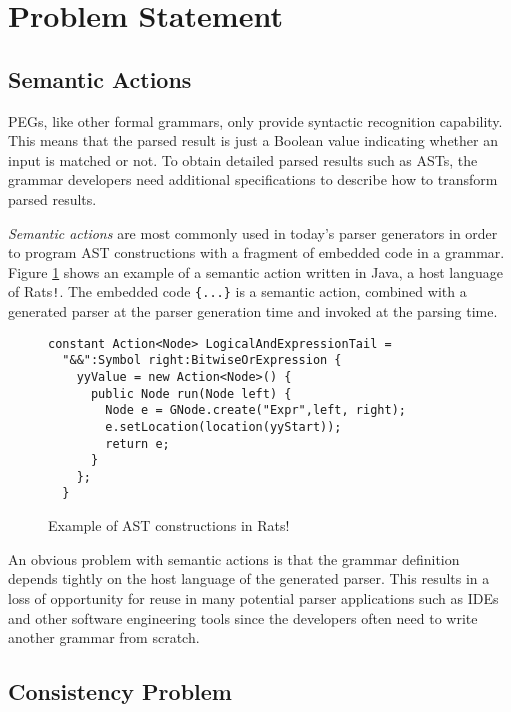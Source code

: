 \documentclass[JIP]{ipsj}
\begin{document}
\section{Problem Statement} 



\subsection{Semantic Actions}

PEGs, like other formal grammars, only provide syntactic recognition capability. This means that  the parsed result is just a Boolean value indicating whether an input is matched or not. To obtain detailed parsed results such as ASTs, the grammar developers need additional specifications to describe how to transform parsed results. 

{\em Semantic actions} are most commonly used in today's parser generators in order to program AST constructions with a fragment of embedded code in a grammar. Figure \ref{fig:action} shows an example of a semantic action written in Java, a host language of Rats\verb|!|\cite{PLDI06_Rats}. The embedded code \verb|{...}| is a semantic action,  combined with a generated parser at the parser generation time and invoked at the parsing time. 

\begin{figure}[htb]
\begin{framed}
{\small \begin{verbatim}
constant Action<Node> LogicalAndExpressionTail =
  "&&":Symbol right:BitwiseOrExpression {
    yyValue = new Action<Node>() {
      public Node run(Node left) {
        Node e = GNode.create("Expr",left, right);
        e.setLocation(location(yyStart));
        return e;
      }
    };
  }
\end{verbatim} }
\end{framed}
\caption{Example of AST constructions in Rats$!$ }
\label{fig:action}
\end{figure}

An obvious problem with semantic actions is that the grammar definition depends tightly on the host language of the generated parser. This results in a loss of opportunity for reuse in many potential parser applications such as IDEs and other software engineering tools since the developers often need to write another grammar from scratch.

\subsection{Consistency Problem}
\end{document}
